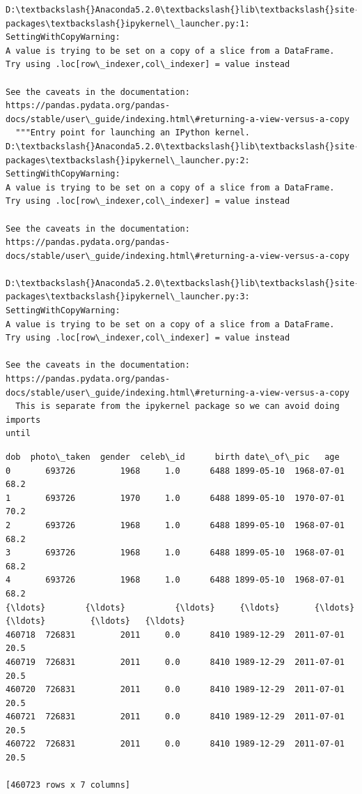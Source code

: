 \documentclass[11pt]{article}
\makeatletter
\newcommand{\boxspacing}{\kern\kvtcb@left@rule\kern\kvtcb@boxsep}
\newcommand{\prompt}[4]{
        \ttfamily\llap{{\color{#2}[#3]:\hspace{3pt}#4}}\vspace{-\baselineskip}
    }
\makeatother
\begin{document}
    \begin{Verbatim}[commandchars=\\\{\}]
D:\textbackslash{}Anaconda5.2.0\textbackslash{}lib\textbackslash{}site-packages\textbackslash{}ipykernel\_launcher.py:1:
SettingWithCopyWarning:
A value is trying to be set on a copy of a slice from a DataFrame.
Try using .loc[row\_indexer,col\_indexer] = value instead

See the caveats in the documentation: https://pandas.pydata.org/pandas-
docs/stable/user\_guide/indexing.html\#returning-a-view-versus-a-copy
  """Entry point for launching an IPython kernel.
D:\textbackslash{}Anaconda5.2.0\textbackslash{}lib\textbackslash{}site-packages\textbackslash{}ipykernel\_launcher.py:2:
SettingWithCopyWarning:
A value is trying to be set on a copy of a slice from a DataFrame.
Try using .loc[row\_indexer,col\_indexer] = value instead

See the caveats in the documentation: https://pandas.pydata.org/pandas-
docs/stable/user\_guide/indexing.html\#returning-a-view-versus-a-copy

D:\textbackslash{}Anaconda5.2.0\textbackslash{}lib\textbackslash{}site-packages\textbackslash{}ipykernel\_launcher.py:3:
SettingWithCopyWarning:
A value is trying to be set on a copy of a slice from a DataFrame.
Try using .loc[row\_indexer,col\_indexer] = value instead

See the caveats in the documentation: https://pandas.pydata.org/pandas-
docs/stable/user\_guide/indexing.html\#returning-a-view-versus-a-copy
  This is separate from the ipykernel package so we can avoid doing imports
until
    \end{Verbatim}

            \begin{tcolorbox}[breakable, size=fbox, boxrule=.5pt, pad at break*=1mm, opacityfill=0]
\prompt{Out}{outcolor}{75}{\boxspacing}
\begin{Verbatim}[commandchars=\\\{\}]
           dob  photo\_taken  gender  celeb\_id      birth date\_of\_pic   age
0       693726         1968     1.0      6488 1899-05-10  1968-07-01  68.2
1       693726         1970     1.0      6488 1899-05-10  1970-07-01  70.2
2       693726         1968     1.0      6488 1899-05-10  1968-07-01  68.2
3       693726         1968     1.0      6488 1899-05-10  1968-07-01  68.2
4       693726         1968     1.0      6488 1899-05-10  1968-07-01  68.2
{\ldots}        {\ldots}          {\ldots}     {\ldots}       {\ldots}        {\ldots}         {\ldots}   {\ldots}
460718  726831         2011     0.0      8410 1989-12-29  2011-07-01  20.5
460719  726831         2011     0.0      8410 1989-12-29  2011-07-01  20.5
460720  726831         2011     0.0      8410 1989-12-29  2011-07-01  20.5
460721  726831         2011     0.0      8410 1989-12-29  2011-07-01  20.5
460722  726831         2011     0.0      8410 1989-12-29  2011-07-01  20.5

[460723 rows x 7 columns]
\end{Verbatim}
\end{tcolorbox}
        
\end{document}
